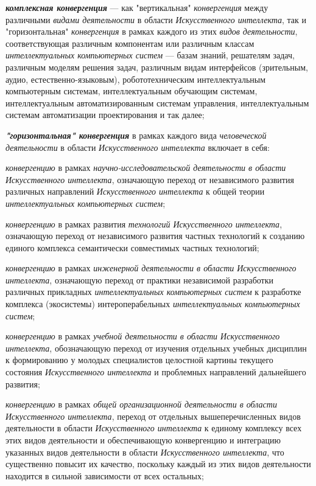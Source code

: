 \begin{textitemize}
	\item
	\textbf{\textit{комплексная конвергенция}} --- как "вертикальная"{} \textit{конвергенция} между различными \textit{видами деятельности} в области \textit{Искусственного интеллекта}, так и "горизонтальная"{} \textit{конвергенция} в рамках каждого из этих \textit{видов деятельности}, соответствующая различным компонентам или различным классам \textit{интеллектуальных компьютерных систем} --- базам знаний, решателям задач, различным моделям решения задач, различным видам интерфейсов (зрительным, аудио, естественно-языковым), робототехническим интеллектуальным компьютерным системам, интеллектуальным обучающим системам, интеллектуальным автоматизированным системам управления, интеллектуальным системам автоматизации проектирования и так далее;
	\item
	\textbf{\textit{"горизонтальная"{} конвергенция}} в рамках каждого вида \textit{человеческой деятельности} в области \textit{Искусственного интеллекта} включает в себя:
	
	\begin{textitemize}
		\item
		\textit{конвергенцию} в рамках \textit{научно-исследовательской деятельности в области Искусственного интеллекта}, означающую переход от независимого развития различных направлений \textit{Искусственного интеллекта} к общей теории \textit{интеллектуальных компьютерных систем};
		\item
		\textit{конвергенцию} в рамках развития \textit{технологий Искусственного интеллекта}, означающую переход от независимого развития частных технологий к созданию единого комплекса семантически совместимых частных технологий;
		\item
		\textit{конвергенцию} в рамках \textit{инженерной деятельности в области Искусственного интеллекта}, означающую переход от практики независимой разработки различных прикладных \textit{интеллектуальных компьютерных систем} к разработке комплекса (экосистемы) интероперабельных \textit{интеллектуальных компьютерных систем};
		\item
		\textit{конвергенцию} в рамках \textit{учебной деятельности в области Искусственного интеллекта}, обозначающую переход от изучения отдельных учебных дисциплин к формированию у молодых специалистов целостной картины текущего состояния \textit{Искусственного интеллекта} и проблемных направлений дальнейшего развития;
		\item
		\textit{конвергенцию} в рамках \textit{общей организационной деятельности в области Искусственного интеллекта}, переход от отдельных вышеперечисленных видов деятельности в области \textit{Искусственного интеллекта} к единому комплексу всех этих видов деятельности и обеспечивающую конвергенцию и интеграцию указанных видов деятельности в области \textit{Искусственного интеллекта}, что существенно повысит их качество, поскольку каждый из этих видов деятельности находится в сильной зависимости от всех остальных;
	\end{textitemize}
	

\end{textitemize}
